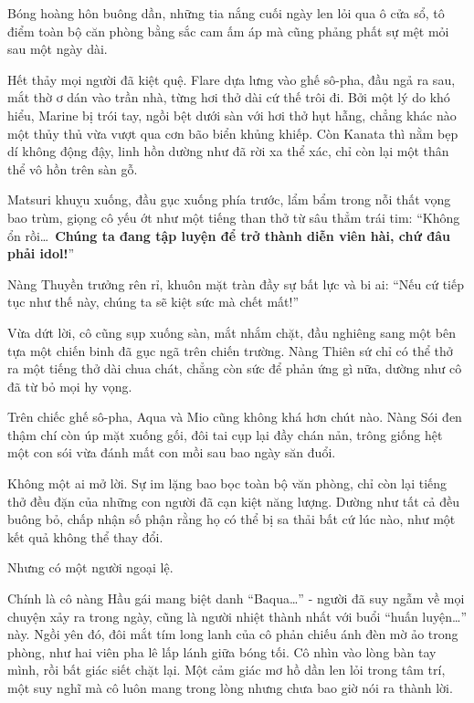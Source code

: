 \documentclass[../main.tex]{subfiles}
\begin{document}
\ct

Bóng hoàng hôn buông dần, những tia nắng cuối ngày len lỏi qua ô cửa sổ, tô điểm toàn bộ căn phòng bằng sắc cam ấm áp mà cũng phảng phất sự mệt mỏi sau một ngày dài.

Hết thảy mọi người đã kiệt quệ. Flare dựa lưng vào ghế sô-pha, đầu ngả ra sau, mắt thờ ơ dán vào trần nhà, từng hơi thở dài cứ thế trôi đi. Bởi một lý do khó hiểu, Marine bị trói tay, ngồi bệt dưới sàn với hơi thở hụt hẫng, chẳng khác nào một thủy thủ vừa vượt qua cơn bão biển khủng khiếp. Còn Kanata thì nằm bẹp dí không động đậy, linh hồn dường như đã rời xa thể xác, chỉ còn lại một thân thể vô hồn trên sàn gỗ.

Matsuri khuỵu xuống, đầu gục xuống phía trước, lẩm bẩm trong nỗi thất vọng bao trùm, giọng cô yếu ớt như một tiếng than thở từ sâu thẳm trái tim: ``Không ổn rồi\dots\ \textbf{Chúng ta đang tập luyện để trở thành diễn viên hài, chứ đâu phải idol!}''


Nàng Thuyền trưởng rên rỉ, khuôn mặt tràn đầy sự bất lực và bi ai: ``Nếu cứ tiếp tục như thế này, chúng ta sẽ kiệt sức mà chết mất!''

Vừa dứt lời, cô cũng sụp xuống sàn, mắt nhắm chặt, đầu nghiêng sang một bên tựa một chiến binh đã gục ngã trên chiến trường. Nàng Thiên sứ chỉ có thể thở ra một tiếng thở dài chua chát, chẳng còn sức để phản ứng gì nữa, dường như cô đã từ bỏ mọi hy vọng.

Trên chiếc ghế sô-pha, Aqua và Mio cũng không khá hơn chút nào. Nàng Sói đen thậm chí còn úp mặt xuống gối, đôi tai cụp lại đầy chán nản, trông giống hệt một con sói vừa đánh mất con mồi sau bao ngày săn đuổi.

Không một ai mở lời. Sự im lặng bao bọc toàn bộ văn phòng, chỉ còn lại tiếng thở đều đặn của những con người đã cạn kiệt năng lượng. Dường như tất cả đều buông bỏ, chấp nhận số phận rằng họ có thể bị sa thải bất cứ lúc nào, như một kết quả không thể thay đổi.

Nhưng có một người ngoại lệ.

Chính là cô nàng Hầu gái mang biệt danh ``Baqua\dots'' - người đã suy ngẫm về mọi chuyện xảy ra trong ngày, cũng là người nhiệt thành nhất với buổi ``huấn luyện\dots'' này. Ngồi yên đó, đôi mắt tím long lanh của cô phản chiếu ánh đèn mờ ảo trong phòng, như hai viên pha lê lấp lánh giữa bóng tối. Cô nhìn vào lòng bàn tay mình, rồi bất giác siết chặt lại. Một cảm giác mơ hồ dần len lỏi trong tâm trí, một suy nghĩ mà cô luôn mang trong lòng nhưng chưa bao giờ nói ra thành lời.
\end{document}
